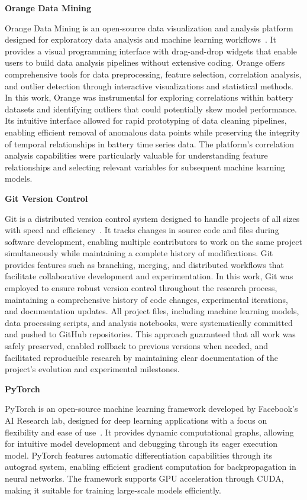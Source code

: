 \textbf{Orange Data Mining}

Orange Data Mining is an open-source data visualization and analysis platform designed for exploratory data analysis and machine learning workflows~\cite{noauthor_biolaborange3_nodate}. It provides a visual programming interface with drag-and-drop widgets that enable users to build data analysis pipelines without extensive coding. Orange offers comprehensive tools for data preprocessing, feature selection, correlation analysis, and outlier detection through interactive visualizations and statistical methods. In this work, Orange was instrumental for exploring correlations within battery datasets and identifying outliers that could potentially skew model performance. Its intuitive interface allowed for rapid prototyping of data cleaning pipelines, enabling efficient removal of anomalous data points while preserving the integrity of temporal relationships in battery time series data. The platform's correlation analysis capabilities were particularly valuable for understanding feature relationships and selecting relevant variables for subsequent machine learning models.

\textbf{Git Version Control}

Git is a distributed version control system designed to handle projects of all sizes with speed and efficiency~\cite{noauthor_git_nodate}. It tracks changes in source code and files during software development, enabling multiple contributors to work on the same project simultaneously while maintaining a complete history of modifications. Git provides features such as branching, merging, and distributed workflows that facilitate collaborative development and experimentation. In this work, Git was employed to ensure robust version control throughout the research process, maintaining a comprehensive history of code changes, experimental iterations, and documentation updates. All project files, including machine learning models, data processing scripts, and analysis notebooks, were systematically committed and pushed to GitHub repositories. This approach guaranteed that all work was safely preserved, enabled rollback to previous versions when needed, and facilitated reproducible research by maintaining clear documentation of the project's evolution and experimental milestones.

\textbf{PyTorch}

PyTorch is an open-source machine learning framework developed by Facebook's AI Research lab, designed for deep learning applications with a 
focus on flexibility and ease of use~\cite{ansel_pytorch_2024}. It provides dynamic computational graphs, 
allowing for intuitive model development and debugging through its eager execution model. PyTorch features 
automatic differentiation capabilities through its autograd system, enabling efficient gradient computation 
for backpropagation in neural networks. The framework supports GPU acceleration through CUDA, making it suitable
for training large-scale models efficiently. 

